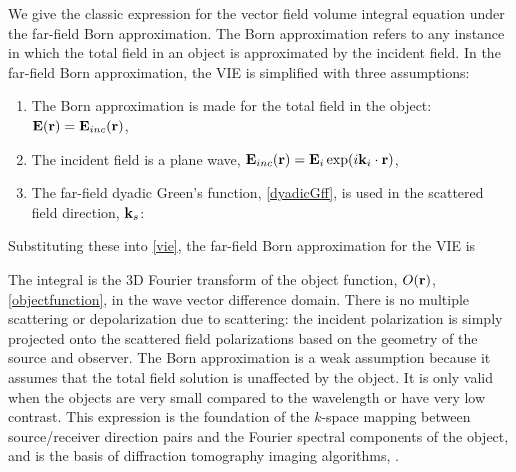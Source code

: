 We give the classic expression for the vector field volume integral equation under the far-field Born approximation. The Born approximation refers to any instance in which the total field in an object is approximated by the incident field. In the far-field Born approximation, the VIE is simplified with three assumptions:
\begin{enumerate}
\item The Born approximation is made for the total field in the object: $\mathbf{E}(\mathbf{r}) = \mathbf{E}_{inc}(\mathbf{r})$,
\item The incident field is a plane wave, $\mathbf{E}_{inc}(\mathbf{r}) = \mathbf{E}_i\exp(i \mathbf{k}_i \cdot \mathbf{r})$,
\item The far-field dyadic Green's function, \eqref{dyadicGff}, is used in the scattered field direction, $\mathbf{k}_s$:
\end{enumerate}

Substituting these into \eqref{vie}, the far-field Born approximation for the VIE is 

The integral is the 3D Fourier transform of the object function, $O(\mathbf{r})$, \eqref{objectfunction}, in the wave vector difference domain. There is no multiple scattering or depolarization due to scattering: the incident polarization is simply projected onto the scattered field polarizations based on the geometry of the source and observer. The Born approximation is a weak assumption because it assumes that the total field solution is unaffected by the object. It is only valid when the objects are very small compared to the wavelength or have very low contrast. This expression is the foundation of the $k$-space mapping between source/receiver direction pairs and the Fourier spectral components of the object, and is the basis of diffraction tomography imaging algorithms, \cite{devaney1984geophysical,chew1995waves}. 



